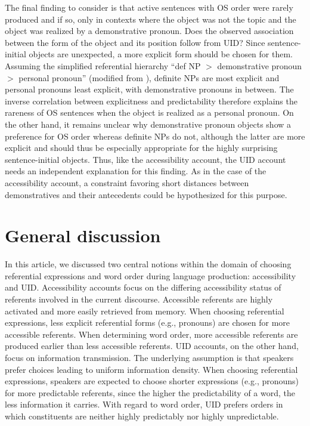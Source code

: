 \documentclass[output=paper,colorlinks,citecolor=brown]{langscibook}
\begin{document}
The final finding to consider is that active sentences with OS order were rarely produced and if so, only in contexts where the object was not the topic and the object was realized by a demonstrative pronoun. Does the observed association between the form of the object and its position follow from UID? Since sentence-initial objects are unexpected, a more explicit form should be chosen for them. Assuming the simplified referential hierarchy ``def NP $>$ demonstrative pronoun $>$ personal pronoun'' (modified from \citealt[313]{Kaiser::Fedele-19}), definite NPs are most explicit and personal pronouns least explicit, with demonstrative pronouns in between. The inverse correlation between explicitness and predictability therefore explains the rareness of OS sentences when the object is realized as a personal pronoun. On the other hand, it remains unclear why demonstrative pronoun objects show a preference for OS order whereas definite NPs do not, although the latter are more explicit and should thus be especially appropriate for the highly surprising sentence-initial objects. Thus, like the accessibility account, the UID account needs an independent explanation for this finding. As in the case of the accessibility account, a constraint favoring short distances between demonstratives and their antecedents could be hypothesized for this purpose.

\section{General discussion}\label{sec:4_discussion}

In this article, we discussed two central notions within the domain of choosing referential expressions and word order during language production: accessibility and UID. Accessibility accounts focus on the differing accessibility status of referents involved in the current discourse. Accessible referents are highly activated and more easily retrieved from memory. When choosing referential expressions, less explicit referential forms (e.g., pronouns) are chosen for more accessible referents. When determining word order, more accessible referents are produced earlier than less accessible referents. UID accounts, on the other hand, focus on information transmission. The underlying assumption is that speakers prefer choices leading to uniform information density. When choosing referential expressions, speakers are expected to choose shorter expressions (e.g., pronouns) for more predictable referents, since the higher the predictability of a word, the less information it carries. With regard to word order, UID prefers orders in which constituents are neither highly predictably nor highly unpredictable.
\end{document}
